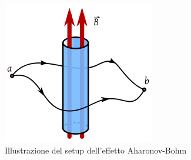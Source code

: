 \documentclass[../../FisicaTeorica.tex]{subfiles}
\begin{document}
\begin{figure}
    \centering
    \includegraphics[scale=0.6]{Immagini/aharonov_bohm.png}
    \caption{Illustrazione del setup dell'effetto Aharonov-Bohm}
    \label{fig:aharonov_bohm}
\end{figure}%
\end{document}
